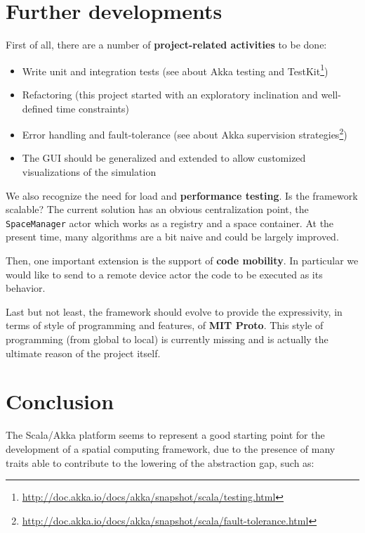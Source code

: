 \documentclass[11pt]{llncs}
\begin{document}
\newpage

\section{Further developments}


First of all, there are a number of \textbf{project-related activities} to be done:

\begin{itemize}
\item Write unit and integration tests (see about Akka testing and TestKit\footnote{\url{http://doc.akka.io/docs/akka/snapshot/scala/testing.html}})
\item Refactoring (this project started with an exploratory inclination and well-defined time constraints)
\item Error handling and fault-tolerance (see about Akka supervision strategies\footnote{\url{http://doc.akka.io/docs/akka/snapshot/scala/fault-tolerance.html}})
\item The GUI should be generalized and extended to allow customized visualizations of the simulation
\end{itemize}

 We also recognize the need for load and \textbf{performance testing}. Is the framework scalable? The current solution has an obvious centralization point, the \texttt{SpaceManager} actor which works as a registry and a space container. At the present time, many algorithms are a bit naive and could be largely improved.

 Then, one important extension is the support of \textbf{code mobility}. In particular we would like to send to a remote device actor the code to be executed as its behavior. 

 Last but not least, the framework should evolve to provide the expressivity, in terms of style of programming and features, of \textbf{MIT Proto}. This style of programming (from global to local) is currently missing and is actually the ultimate reason of the project itself.

\newpage

\section{Conclusion}

 The Scala/Akka platform seems to represent a good starting point for the development of a spatial computing framework, due to the presence of many traits able to contribute to the lowering of the abstraction gap, such as:
 
\end{document}
